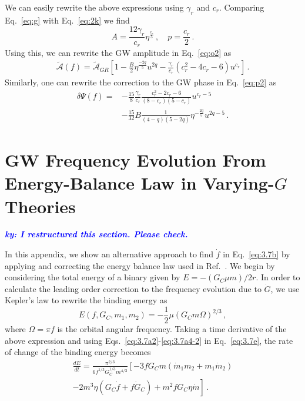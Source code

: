 \documentclass[prd,twocolumn,nofootinbib]{revtex4-1}
\newcommand{\ky}[1]{\textcolor{blue}{\it{\textbf{ky: #1}}} }
\begin{document}
We can easily rewrite the above expressions using $\gamma_r$ and $c_r$. 
Comparing Eq.~\eqref{eq:g} with Eq.~\eqref{eq:2k} we find
\begin{equation}\label{eq:i}
A=\frac{12\gamma_r}{c_r}\eta^{\frac{c_r}{5}}\,, \quad p=\frac{c_r}{2}\,.
\end{equation}
Using this, we can rewrite the GW amplitude in Eq.~\eqref{eq:o2} as
\begin{align}\label{eq:o}
\tilde{\mathcal{A}}(f)=\tilde{\mathcal{A}}_{GR} \left[1-\frac{B}{2}\eta^{\frac{-2q}{5}}u^{2q}-\frac{\gamma_r}{c_r}(c^2_r-4c_r-6)u^{c_r}\right]\,.
\end{align}
Similarly, one can rewrite the correction to the GW phase in Eq.~\eqref{eq:p2} as
\begin{align}\label{eq:p}
\delta\Psi(f)=&-\frac{15}{8}\frac{\gamma_r}{c_r}\frac{c_r^2-2c_r-6}{(8-c_r)(5-c_r)}u^{c_r-5}\nonumber\\ &-\frac{15}{32}B\frac{1}{(4-q)(5-2q)}\eta^{-\frac{2q}{5}}u^{2q-5}\,.
 \end{align}

\section{GW Frequency Evolution From Energy-Balance Law in Varying-$G$ Theories} \label{appendix_2}

\ky{I restructured this section. Please check.}

In this appendix, we show an alternative approach to find $\dot f$ in Eq.~\eqref{eq:3.7b} by applying and correcting the energy balance law used in Ref.~\cite{Yunes:2009bv}. We begin by considering the total energy of a binary given by $E=-(G_C\mu m)/2r$. In order to calculate the leading order correction to the frequency evolution due to $\dot G$, we  use Kepler's law to rewrite the binding energy as 
 \begin{equation}\label{eq:3.7e}
 E(f,G_C,m_1,m_2)=-\frac{1}{2}\mu (G_Cm\Omega)^{2/3}\,,
 \end{equation}
 where $\Omega=\pi f$ is the orbital angular frequency. Taking a time derivative of the above expression and using Eqs.~\eqref{eq:3.7a2}-\eqref{eq:3.7a4-2} in Eq.~\eqref{eq:3.7e}, the rate of change of the binding energy becomes
 \begin{align}\label{eq:3.7j}
 \frac{d E}{d t}=\frac{\pi^{2/3}}{6f^{1/3}G_C^{1/3}m^{4/3}}\left[-3fG_Cm(\dot{m}_1m_2+m_1\dot{m}_2)\right.\nonumber\\ \left.-2m^3\eta(G_C\dot{f}+f\dot{G}_C)+m^2fG_C\eta\dot{m}\right]\,.
 \end{align}
 
\end{document}
